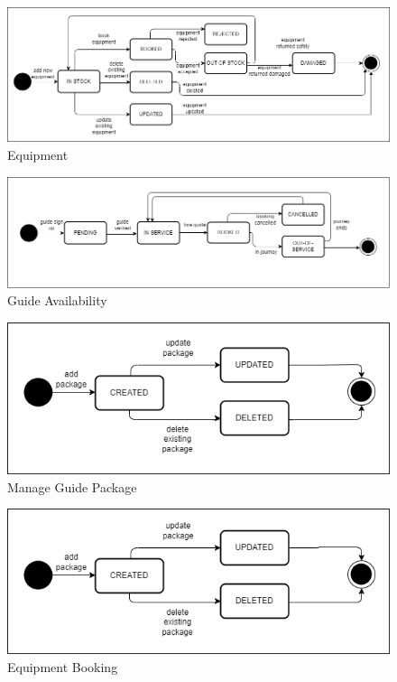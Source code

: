 \begin{figure}[h!]
    \centering
    \includegraphics[width=1\textwidth]{Images/State transition diagrams/State Transition Diagrams-1-Equipments.drawio.png}
    \caption{Equipment}
\end{figure}

\begin{figure}[h!]
    \centering
    \includegraphics[width=1\textwidth]{Images/State transition diagrams/State Transition Diagrams-2-Guide Availability.drawio.png}
    \caption{Guide Availability}
\end{figure}

\begin{figure}[h!]
    \centering
    \includegraphics[width=1\textwidth]{Images/State transition diagrams/State Transition Diagrams-3-Manage Guide Package.drawio.png}
    \caption{Manage Guide Package}
\end{figure}

\begin{figure}[h!]
    \centering
    \includegraphics[width=1\textwidth]{Images/State transition diagrams/State Transition Diagrams-4-Equipment Booking.drawio.png}
    \caption{Equipment Booking}
\end{figure}

